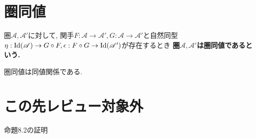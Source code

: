 \section{圏同値}
\begin{Def}
圏$\mathscr{A},\mathscr{A}'$に対して, 関手$F:\mathscr{A}\rightarrow\mathscr{A}', G:\mathscr{A}\rightarrow\mathscr{A}'$と自然同型$\eta:\mathrm{Id}(\mathscr{A})\rightarrow G\circ F,\epsilon:F\circ G\rightarrow\rm{Id}(\mathscr{A}')$が存在するとき
\bf{圏$\mathscr{A},\mathscr{A}'$は圏同値である}という.
\end{Def}
\begin{Prop}
圏同値は同値関係である.
\end{Prop}

\begin{comment}
\section{Haskにおける自然同型}
\subsection{mirror関数}
Tree関手からTree関手への自然同型
\subsection{Maybe関手とEither()関手の間の自然同型}
\section{まとめ}
aa
\end{comment}

\section{この先レビュー対象外}
命題8.2の証明